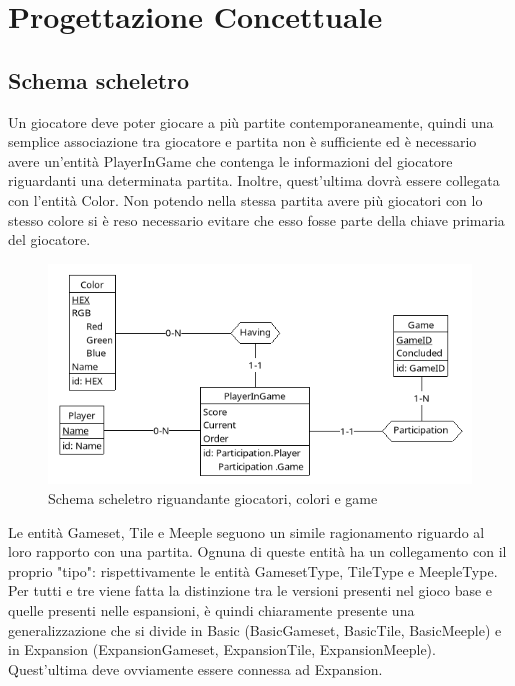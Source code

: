 \section{Progettazione Concettuale}
\subsection{Schema scheletro}
Un giocatore deve poter giocare a più partite contemporaneamente, quindi una semplice associazione tra giocatore e partita non è sufficiente ed è necessario avere un'entità PlayerInGame che contenga le informazioni del giocatore riguardanti una determinata partita. Inoltre, quest'ultima dovrà essere collegata con l'entità Color. Non potendo nella stessa partita avere più giocatori con lo stesso colore si è reso necessario evitare che esso fosse parte della chiave primaria del giocatore.

\begin{figure}[ht]
    \centering\includegraphics[scale=0.5]{images/Progettazione/Concettuale/Scheletro1.png}
    \caption{Schema scheletro riguandante giocatori, colori e game}
\end{figure}

Le entità Gameset, Tile e Meeple seguono un simile ragionamento riguardo al loro rapporto con una partita. Ognuna di queste entità ha un collegamento con il proprio "tipo": rispettivamente le entità GamesetType, TileType e MeepleType. Per tutti e tre viene fatta la distinzione tra le versioni presenti nel gioco base e quelle presenti nelle espansioni, è quindi chiaramente presente una generalizzazione che si divide in Basic (BasicGameset, BasicTile, BasicMeeple) e in Expansion (ExpansionGameset, ExpansionTile, ExpansionMeeple). Quest'ultima deve ovviamente essere connessa ad Expansion.
\clearpage

